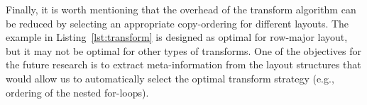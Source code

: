 Finally, it is worth mentioning that the overhead of the transform algorithm can be reduced by selecting an appropriate copy-ordering for different layouts. The example in Listing~\ref{lst:transform} is designed as optimal for row-major layout, but it may not be optimal for other types of transforms. One of the objectives for the future research is to extract meta-information from the layout structures that would allow us to automatically select the optimal transform strategy (e.g., ordering of the nested for-loops).
